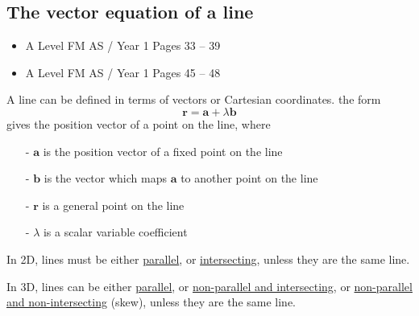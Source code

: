 \documentclass[11pt, a4paper]{article}
\begin{document}
\subsection{The vector equation of a line}
\begin{itemize}
\item A Level FM AS / Year 1 \hspace{1cm} Pages 33 -- 39
\item A Level FM AS / Year 1 \hspace{1cm} Pages 45 -- 48
\end{itemize} \par
A line can be defined in terms of vectors or Cartesian coordinates. the form
\begin{equation*}
\boldsymbol{r}=\boldsymbol{a}+\lambda\boldsymbol{b}
\end{equation*}
gives the position vector of a point on the line, where
\begin{itemize}
\item[-]$\boldsymbol{a}$ is the position vector of a fixed point on the line
\vspace{-0.25cm}
\item[-]$\boldsymbol{b}$ is the vector which maps $\boldsymbol{a}$ to another point on the line
\vspace{-0.25cm}
\item[-]$\boldsymbol{r}$ is a general point on the line
\vspace{-0.25cm}
\item[-]$\lambda$ is a scalar variable coefficient
\end{itemize}

In 2D, lines must be either \underline{parallel}, or \underline{intersecting}, unless they are the same line.

In 3D, lines can be either \underline{parallel}, or \underline{non-parallel and intersecting}, or \underline{non-parallel and non-intersecting} (skew), unless they are the same line.
\vspace{0.5cm}
\end{document}
